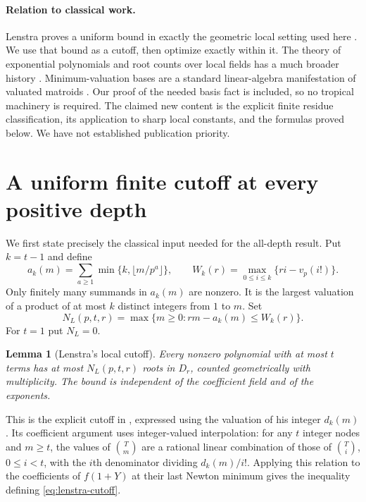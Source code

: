 \documentclass[11pt,letterpaper]{article}
\newtheorem{lemma}[theorem]{Lemma}
\theoremstyle{definition}\newtheorem{definition}[theorem]{Definition}
\theoremstyle{remark}\newtheorem{remark}[theorem]{Remark}
\newcommand{\vp}{v_p}
\begin{document}
\paragraph{Relation to classical work.}
Lenstra proves a uniform bound in exactly the geometric local setting
used here \cite[Theorem 3 and Section 3]{Lenstra}. We use that bound as a
cutoff, then optimize exactly within it. The theory of exponential
polynomials and root counts over local fields has a much broader history
\cite{PoortenRumely,AvendanoKrick}. Minimum-valuation bases are a standard
linear-algebra manifestation of valuated matroids \cite{Battistella}.
Our proof of the needed basis fact is included, so no tropical machinery
is required. The claimed new content is the explicit finite residue
classification, its application to sharp local constants, and the
formulas proved below. We have not established publication priority.

\section{A uniform finite cutoff at every positive depth}
We first state precisely the classical input needed for the all-depth
result. Put $k=t-1$ and define
\[
 a_k(m)=\sum_{a\ge1}\min\{k,\lfloor m/p^a\rfloor\},\qquad
 W_k(r)=\max_{0\le i\le k}\{ri-\vp(i!)\}.
\]
Only finitely many summands in $a_k(m)$ are nonzero. It is the largest
valuation of a product of at most $k$ distinct integers from $1$ to $m$.
Set
\begin{equation}\label{eq:lenstra-cutoff}
 N_L(p,t,r)=\max\{m\ge0:rm-a_k(m)\le W_k(r)\}.
\end{equation}
For $t=1$ put $N_L=0$.

\begin{lemma}[Lenstra's local cutoff]\label{lem:lenstra}
Every nonzero polynomial with at most $t$ terms has at most
$N_L(p,t,r)$ roots in $D_r$, counted geometrically with multiplicity.
The bound is independent of the coefficient field and of the exponents.
\end{lemma}

This is the explicit cutoff in \cite[Section 3]{Lenstra}, expressed using
the valuation of his integer $d_k(m)$. Its coefficient argument uses
integer-valued interpolation: for any $t$ integer nodes and $m\ge t$, the values of
$\binom{T}{m}$ are a rational linear combination of those of
$\binom{T}{i}$, $0\le i<t$, with the $i$th denominator dividing
$d_k(m)/i!$. Applying this relation to the coefficients of $f(1+Y)$ at
their last Newton minimum gives the inequality defining
\eqref{eq:lenstra-cutoff}.
\end{document}
